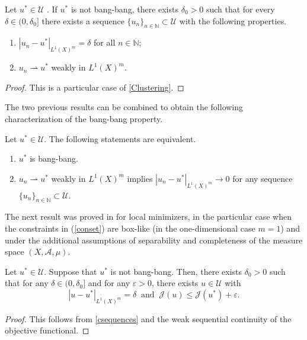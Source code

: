 \documentclass[hidelinks,onefignum,onetabnum]{siamart220329}
\begin{document}
\begin{proposition}\label{csequences}
	Let $u^*\in\mathcal U$ . If $u^*$ is not bang-bang, 
	there exists $\delta_0>0$ such that for every $\delta\in(0,\delta_0]$ there exists a sequence $\{u_n\}_{n\in\mathbb N}\subset\mathcal U$ with the following properties. 
	\begin{enumerate}
		\item $|u_{n}-u^*|_{{L^1(X)^m}}=\delta$ for all $n\in\mathbb N$; 
		
		\item $u_n\rightharpoonup u^*$ weakly in ${L^1(X)^m}$.
	\end{enumerate}
\end{proposition}
\begin{proof}
	This is a particular case of \cref{Clustering}.
\end{proof}


The two previous results can be combined to obtain the following characterization of the bang-bang property.
\begin{theorem}\label{cor:equiv}
	Let $u^*\in\mathcal U$. The following statements are equivalent.
	\begin{enumerate}
		\item $u^*$ is bang-bang.
		\item $u_n\rightharpoonup u^*$ weakly in ${L^1(X)^m}$ implies $|u_n-u^*|_{{L^1(X)^m}}\to 0$ for any sequence $\{u_n\}_{n\in\mathbb N}\subset\mathcal U$.
	\end{enumerate}
\end{theorem}

The next result was proved in \cite[Theorem 2.1]{Casasbang} for local minimizers, in the particular case when the constraints in (\ref{conset}) are box-like (in the one-dimensional case $m = 1$) and under the additional assumptions of separability and completeness of the measure space $(X,\mathcal A,\mu)$.
\begin{corollary}\label{VpCasas}
	Let $u^*\in\mathcal U$. Suppose that $u^*$ is not bang-bang. 
	Then, there exists $\delta_0 > 0$ such that for any $\delta \in (0,\delta_0]$ and
	for any $\varepsilon > 0$,
	there exists $u \in \mathcal U$
	with
	\begin{equation}
		|{u - u^*}|_{{L^1(X)^m}} = \delta\ \text{ and }\ \mathcal J(u)\le\mathcal J(u^*) + \varepsilon.
	\end{equation}
\end{corollary}
\begin{proof}
	This follows from \cref{csequences} and the weak  sequential continuity of the objective functional.  
\end{proof}
\end{document}
